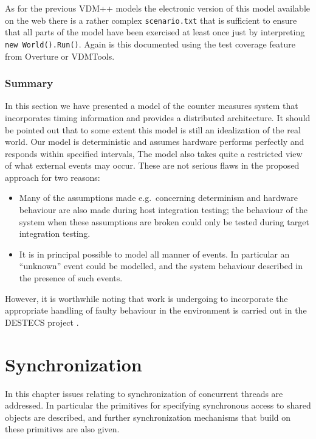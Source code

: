 \documentclass{overturerepchap}
\newcommand{\VDMTools}{VDMTools}
\begin{document}
As for the previous VDM++ models the electronic
version of this model available on the web there is a rather complex 
\texttt{scenario.txt} that is sufficient to ensure that all parts of the
model have been exercised at least once just by interpreting
\texttt{new World().Run()}. Again is this documented using the test
coverage feature from Overture or \VDMTools.

\subsection{Summary}

In this section we have presented a model of the counter measures
system that incorporates timing information and provides a distributed
architecture. It should be pointed out that to some extent this model
is still an idealization of the real world. Our model is deterministic and
assumes hardware performs perfectly and responds within specified
intervals, The model also takes quite a restricted view of what
external events may occur. These are not serious flaws in the proposed
approach for two reasons:

\begin{itemize}
\item Many of the assumptions made e.g.\ concerning determinism and
hardware behaviour are also made during host integration testing;
the behaviour of the system when these assumptions are broken could
only be tested during target integration testing.
\item It is in principal possible to model all manner of events. In
particular an ``unknown'' event could be modelled, and the system
behaviour described in the presence of such events.
\end{itemize}

However, it is worthwhile noting that work is undergoing to
incorporate the appropriate handling of faulty behaviour in the
environment is carried out in the DESTECS project \cite{Broenink&10}. 

\chapter{Synchronization}\label{chap:sync}

In this chapter issues relating to synchronization of concurrent
threads are addressed.  In particular the primitives for specifying
synchronous access to shared objects are described, and further
synchronization mechanisms that build on these primitives are also
given.
\end{document}
